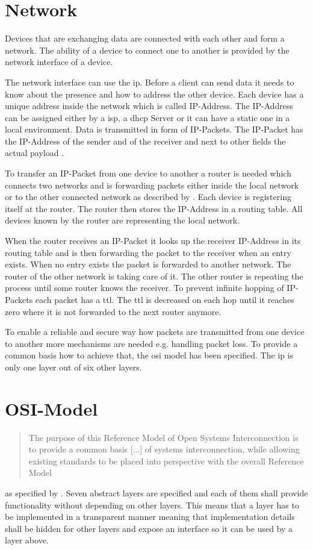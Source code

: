 \section{Network}
Devices that are exchanging data are connected with each other and form a network. The ability of a device to connect one to another is provided by the network interface of a device. 

The network interface can use the \gls{ip}. Before a client can send data it needs to know about the presence and how to address the other device. Each device has a unique address inside the network which is called IP-Address. The IP-Address can be assigned either by a \gls{isp}, a \gls{dhcp} Server or it can have a static one in a local environment. 
Data is transmitted in form of IP-Packets. The IP-Packet has the IP-Address of the sender and of the receiver and next to other fields the actual payload \cite{roberts}.

To transfer an IP-Packet from one device to another a router is needed which connects two networks and is forwarding packets either inside the local network or to the other connected network as described by \cite{shuler2002}.
Each device is registering itself at the router. The router then stores the IP-Address in a routing table. All devices known by the router are representing the local network. 

When the router receives an IP-Packet it looks up the receiver IP-Address in its routing table and is then forwarding the packet to the receiver when an entry exists.
When no entry exists the packet is forwarded to another network. The router of the other network is taking care of it. The other router is repeating the process until some router knows the receiver.
To prevent infinite hopping of IP-Packets each packet has a \gls{ttl}. The \gls{ttl} is decreased on each hop until it reaches zero where it is not forwarded to the next router anymore. 

To enable a reliable and secure way how packets are transmitted from one device to another more mechanisms are needed e.g. handling packet loss. 
To provide a common basis how to achieve that, the \gls{osi} model has been specified.
The \gls{ip} is only one layer out of six other layers.

\section{OSI-Model}
\blockquote{The purpose of this Reference Model of Open Systems Interconnection is to provide a common basis [...] of systems interconnection, while allowing existing standards to be placed into perspective with the overall Reference Model} as specified by \citet{ISO1064-osi-model}. Seven abstract layers are specified and each of them shall provide functionality without depending on other layers. This means that a layer has to be implemented in a transparent manner meaning that implementation details shall be hidden for other layers and expose an interface so it can be used by a layer above.

